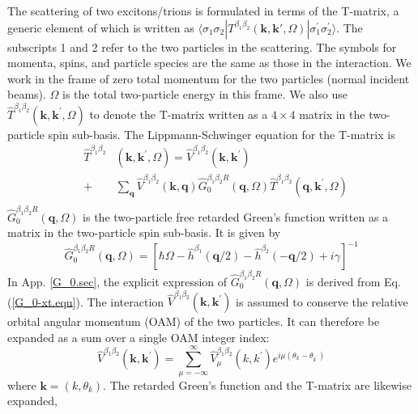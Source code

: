 \documentclass[aps,prb,superscriptaddress,letterpaper,amsmath,amssymb,twocolumn,preprintnumbers]{revtex4}
\begin{document}
The scattering of two excitons/trions is formulated in terms of the T-matrix, a generic element of which is written as $\langle \sigma_1 \sigma_2 | T^{\beta_1 \beta_2} (\mathbf{k} , \mathbf{k}', \Omega ) | \sigma^{\prime}_1 \sigma^{\prime}_2 \rangle$. The subscripts 1 and 2 refer to the two particles in the scattering. The symbols for momenta, spins, and particle species are the same as those in the interaction. We work in the frame of zero total momentum for the two particles (normal incident beams). $\Omega$ is the total two-particle energy in this frame. We also use $\hat{T}^{\beta_1 \beta_2} (\mathbf{k},\mathbf{k}^{\prime},\Omega)$ to denote the T-matrix written as a $4 \times 4$ matrix in the two-particle spin sub-basis. The Lippmann-Schwinger equation for the T-matrix is
\begin{eqnarray}\label{T-matrix-xt.equ}
& \hat{T}^{\beta_1 \beta_2} & (\mathbf{k},\mathbf{k}^{\prime},\Omega) = \hat{V}^{\beta_1 \beta_2} (\mathbf{k},\mathbf{k}^{\prime}) \nonumber \\
&+&\sum_{\mathbf{q}} \hat{V}^{\beta_1 \beta_2} (\mathbf{k},\mathbf{q}) \hat{G}_{0}^{\beta_1 \beta_2 R} (\mathbf{q},\Omega) \hat{T}^{\beta_1 \beta_2} (\mathbf{q},\mathbf{k}^{\prime},\Omega)  \nonumber \\
& &
\end{eqnarray}
$\hat{G}_{0}^{\beta_1 \beta_2 R} (\mathbf{q},\Omega)$ is the two-particle free retarded Green's function written as a matrix in the two-particle spin sub-basis. It is given by
\begin{equation}\label{G_0-xt.equ}
\hat{G}_{0}^{\beta_1 \beta_2 R} (\mathbf{q},\Omega) = \left[ \hbar \Omega - \hat{h}^{\beta_1} (\mathbf{q} / 2) - \hat{h}^{\beta_2} (-\mathbf{q} / 2) + i \gamma \right]^{-1}
\end{equation}
In App. \ref{G_0.sec}, the explicit expression of $\hat{G}_{0}^{\beta_1 \beta_2 R} (\mathbf{q},\Omega)$ is derived from Eq. (\ref{G_0-xt.equ}).
The interaction $\hat{V}^{\beta_1 \beta_2} (\mathbf{k},\mathbf{k}^{\prime})$ is assumed to conserve the relative orbital angular momentum (OAM) of the two particles. It can therefore  be expanded as a sum over a single OAM integer index:
\begin{equation}\label{V-OAM.equ}
\hat{V}^{\beta_1 \beta_2} (\mathbf{k},\mathbf{k}^{\prime}) = \sum_{\mu = -\infty}^{\infty} \hat{V}^{\beta_1 \beta_2}_{\mu} (k,k^{\prime}) e^{i \mu (\theta_k - \theta_{k^{\prime}})}
\end{equation}
where $\mathbf{k} = (k,\theta_k)$.
The retarded Green's function and the T-matrix are likewise expanded,
\end{document}
